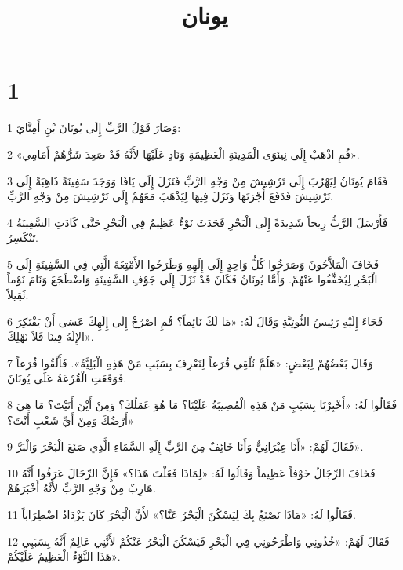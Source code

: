 

\title{يونان}


\chapter{1}

\par 1 وَصَارَ قَوْلُ الرَّبِّ إِلَى يُونَانَ بْنِ أَمِتَّايَ:
\par 2 «قُمِ اذْهَبْ إِلَى نِينَوَى الْمَدِينَةِ الْعَظِيمَةِ وَنَادِ عَلَيْهَا لأَنَّهُ قَدْ صَعِدَ شَرُّهُمْ أَمَامِي».
\par 3 فَقَامَ يُونَانُ لِيَهْرُبَ إِلَى تَرْشِيشَ مِنْ وَجْهِ الرَّبِّ فَنَزَلَ إِلَى يَافَا وَوَجَدَ سَفِينَةً ذَاهِبَةً إِلَى تَرْشِيشَ فَدَفَعَ أُجْرَتَهَا وَنَزَلَ فِيهَا لِيَذْهَبَ مَعَهُمْ إِلَى تَرْشِيشَ مِنْ وَجْهِ الرَّبِّ.
\par 4 فَأَرْسَلَ الرَّبُّ رِيحاً شَدِيدَةً إِلَى الْبَحْرِ فَحَدَثَ نَوْءٌ عَظِيمٌ فِي الْبَحْرِ حَتَّى كَادَتِ السَّفِينَةُ تَنْكَسِرُ.
\par 5 فَخَافَ الْمَلاَّحُونَ وَصَرَخُوا كُلُّ وَاحِدٍ إِلَى إِلَهِهِ وَطَرَحُوا الأَمْتِعَةَ الَّتِي فِي السَّفِينَةِ إِلَى الْبَحْرِ لِيُخَفِّفُوا عَنْهُمْ. وَأَمَّا يُونَانُ فَكَانَ قَدْ نَزَلَ إِلَى جَوْفِ السَّفِينَةِ وَاضْطَجَعَ وَنَامَ نَوْماً ثَقِيلاً.
\par 6 فَجَاءَ إِلَيْهِ رَئِيسُ النُّوتِيَّةِ وَقَالَ لَهُ: «مَا لَكَ نَائِماً؟ قُمِ اصْرُخْ إِلَى إِلَهِكَ عَسَى أَنْ يَفْتَكِرَ الإِلَهُ فِينَا فَلاَ نَهْلِكَ».
\par 7 وَقَالَ بَعْضُهُمْ لِبَعْضٍ: «هَلُمَّ نُلْقِي قُرَعاً لِنَعْرِفَ بِسَبَبِ مَنْ هَذِهِ الْبَلِيَّةُ». فَأَلْقُوا قُرَعاً فَوَقَعَتِ الْقُرْعَةُ عَلَى يُونَانَ.
\par 8 فَقَالُوا لَهُ: «أَخْبِرْنَا بِسَبَبِ مَنْ هَذِهِ الْمُصِيبَةُ عَلَيْنَا؟ مَا هُوَ عَمَلُكَ؟ وَمِنْ أَيْنَ أَتَيْتَ؟ مَا هِيَ أَرْضُكَ وَمِنْ أَيِّ شَعْبٍ أَنْتَ؟»
\par 9 فَقَالَ لَهُمْ: «أَنَا عِبْرَانِيٌّ وَأَنَا خَائِفٌ مِنَ الرَّبِّ إِلَهِ السَّمَاءِ الَّذِي صَنَعَ الْبَحْرَ وَالْبَرَّ».
\par 10 فَخَافَ الرِّجَالُ خَوْفاً عَظِيماً وَقَالُوا لَهُ: «لِمَاذَا فَعَلْتَ هَذَا؟» فَإِنَّ الرِّجَالَ عَرَفُوا أَنَّهُ هَارِبٌ مِنْ وَجْهِ الرَّبِّ لأَنَّهُ أَخْبَرَهُمْ.
\par 11 فَقَالُوا لَهُ: «مَاذَا نَصْنَعُ بِكَ لِيَسْكُنَ الْبَحْرُ عَنَّا؟» لأَنَّ الْبَحْرَ كَانَ يَزْدَادُ اضْطِرَاباً.
\par 12 فَقَالَ لَهُمْ: «خُذُونِي وَاطْرَحُونِي فِي الْبَحْرِ فَيَسْكُنَ الْبَحْرُ عَنْكُمْ لأَنَّنِي عَالِمٌ أَنَّهُ بِسَبَبِي هَذَا النَّوْءُ الْعَظِيمُ عَلَيْكُمْ».
